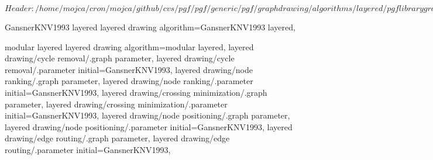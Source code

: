 %
%
%

\ProvidesFileRCS[v\pgfversion] $Header: /home/mojca/cron/mojca/github/cvs/pgf/pgf/generic/pgf/graphdrawing/algorithms/layered/pgflibrarygraphdrawing.layered.code.tex,v 1.6 2011/10/16 08:40:10 jannis-pohlmann Exp $





%
% 




%
%



%
%
%
\pgfgddeclarealgorithmkey
  {GansnerKNV1993 layered}
  {layered drawing}
  {
    algorithm=GansnerKNV1993 layered,
  }


%
%
\pgfgddeclarealgorithmkey
  {modular layered}
  {layered drawing}
  {
    algorithm=modular layered,
    layered drawing/cycle removal/.graph parameter,
    layered drawing/cycle removal/.parameter initial=GansnerKNV1993,
    layered drawing/node ranking/.graph parameter,
    layered drawing/node ranking/.parameter initial=GansnerKNV1993,
    layered drawing/crossing minimization/.graph parameter,
    layered drawing/crossing minimization/.parameter initial=GansnerKNV1993,
    layered drawing/node positioning/.graph parameter,
    layered drawing/node positioning/.parameter initial=GansnerKNV1993,
    layered drawing/edge routing/.graph parameter,
    layered drawing/edge routing/.parameter initial=GansnerKNV1993,
  }

\endinput
